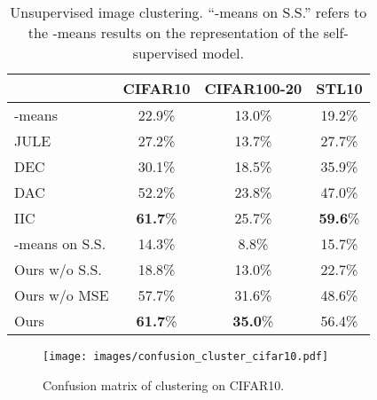 \begin{table}[htb]
\centering
\footnotesize
\caption{Unsupervised image clustering. ``-means on S.S.'' refers to the -means results on the representation of the self-supervised model.}\label{tab:clustering}
\begin{tabular}{lccc}
\toprule{}
& CIFAR10 & CIFAR100-20 & STL10  \\
\midrule
-means~\cite{MackQueen67_Kmeans} &22.9\%  &13.0\% &19.2\% \\
JULE~\cite{yang2016joint} & 27.2\% &13.7\% & 27.7\% \\
DEC~\cite{Xie16_DEC} & 30.1\% &18.5\% & 35.9\% \\
DAC~\cite{Chang_2018_DAC} & 52.2\%  &23.8\% & 47.0\% \\
IIC~\cite{ji2019invariant} &  \textbf{61.7}\%  &25.7\% & \textbf{59.6}\% \\
\midrule
-means on S.S. & 14.3\% & 8.8\% & 15.7\% \\
\midrule
Ours w/o S.S. & 18.8\%  & 13.0\% &  22.7\% \\
Ours w/o MSE &  57.7\%  & 31.6\% &  48.6\% \\
Ours & \textbf{61.7}\%  &\textbf{35.0}\% & 56.4\% \\
\bottomrule
\end{tabular}
\end{table}

\begin{figure}
\centering
\texttt{[image: images/confusion\_cluster\_cifar10.pdf]}
\caption{Confusion matrix of clustering on CIFAR10.}\label{fig:cm_cluster}
\end{figure}

